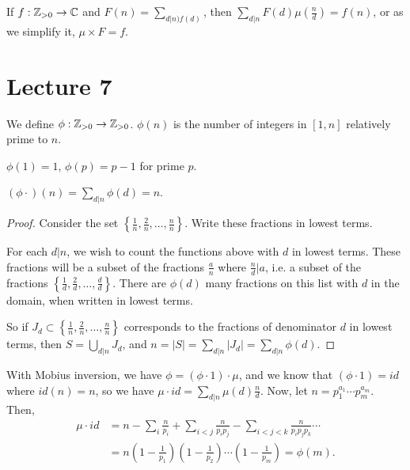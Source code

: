 \documentclass{article}
\begin{document}
\begin{theorem}
    If $f : \mathbb Z_{> 0} \to \mathbb C$ and $F(n) = \sum_{d | n) f(d)}$, then $\sum_{d|n} F(d) \mu\left(\frac{n}{d}\right) = f(n)$, or as we simplify it, $\mu \times F = f$.
\end{theorem}

\section{Lecture 7}
\begin{definition}
    We define $\phi: \mathbb Z_{> 0} \to \mathbb Z_{> 0}$. $\phi(n)$ is the number of integers in $[1, n]$ relatively prime to $n$. 

    $\phi(1) = 1$, $\phi(p) = p-1$ for prime $p$.
\end{definition}

\begin{proposition}
    $(\phi \cdot )(n) = \sum_{d | n} \phi(d) = n$.
\end{proposition}

\begin{proof}
    Consider the set $\left\{\frac{1}{n}, \frac{2}{n}, \ldots, \frac{n}{n}\right\}$. Write these fractions in lowest terms. 
    
    For each $d | n$, we wish to count the functions above with $d$ in lowest terms. These fractions will be a subset of the fractions $\frac{a}{n}$ where $\frac{n}{d} | a$, i.e. a subset of the fractions $\left\{\frac{1}{d}, \frac{2}{d}, \ldots, \frac{d}{d}\right\}$. There are $\phi(d)$ many fractions on this list with $d$ in the domain, when written in lowest terms.

    So if $J_d \subset \left\{\frac{1}{n}, \frac{2}{n}, \ldots, \frac{n}{n}\right\}$ corresponds to the fractions of denominator $d$ in lowest terms, then $S = \bigcup_{d | n} J_d$, and $n = |S| = \sum_{d | n} |J_d| = \sum_{d | n} \phi(d)$. 
\end{proof}

With Mobius inversion, we have $\phi = (\phi \cdot 1) \cdot \mu$, and we know that $(\phi \cdot 1) = id$ where $id(n) = n$, so we have $\mu \cdot id = \sum_{d | n} \mu(d) \frac{n}{d}$. Now, let $n = p_1^{a_1}\cdots p_m^{a_m}$.  Then,
\begin{align*}
    \mu \cdot id &= n - \sum_{i} \frac{n}{p_i} + \sum_{i < j} \frac{n}{p_ip_j} - \sum_{i < j < k} \frac{n}{p_ip_jp_k} \cdots \\
    &= n\left(1 - \frac{1}{p_1}\right)\left(1 - \frac{1}{p_2}\right)\cdots \left(1 - \frac{1}{p_m}\right) = \phi(m).
\end{align*}
\end{document}
